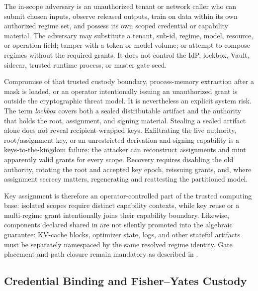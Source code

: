 \documentclass[11pt,a4paper]{article}
\begin{document}
The in-scope adversary is an unauthorized tenant or network caller
who can submit chosen inputs, observe released outputs, train on
data within its own authorized regime set, and possess its own scoped
credential or capability material.  The adversary may substitute a
tenant, sub-id, regime, model, resource, or operation field; tamper
with a token or model volume; or
attempt to compose regimes without the required grants.  It does
not control the IdP, lockbox, Vault, sidecar, trusted runtime
process, or master gate seed.

Compromise of that trusted custody boundary, process-memory
extraction after a mask is loaded, or an operator intentionally
issuing an unauthorized grant is outside the cryptographic threat
model.  It is nevertheless an explicit system risk.  The term
\emph{lockbox} covers both a sealed distributable artifact and the
authority that holds the root, assignment, and signing material.
Stealing a sealed artifact alone does not reveal recipient-wrapped
keys.  Exfiltrating the live authority, root/assignment key, or an
unrestricted derivation-and-signing capability is a keys-to-the-kingdom
failure: the attacker can reconstruct assignments and mint apparently
valid grants for every scope.  Recovery requires disabling the old
authority, rotating the root and accepted key epoch, reissuing grants,
and, where assignment secrecy matters, regenerating and reattesting the
partitioned model.

Key assignment is therefore an operator-controlled part of the
trusted computing base: isolated scopes require distinct capability
contexts, while key reuse or a multi-regime grant intentionally joins
their capability boundary.  Likewise, components declared shared in
 are not silently promoted into the
algebraic guarantee: KV-cache blocks, optimizer state, logs, and
other stateful artifacts must be separately namespaced by the same
resolved regime identity.  Gate placement and path closure remain
mandatory as described in .

\subsection{Credential Binding and Fisher--Yates Custody}
\end{document}

